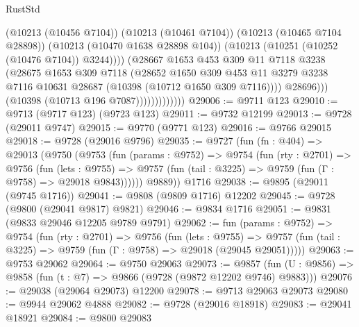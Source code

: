 \begin{lexlean}{RustStd}
\begin{coremodule}
                                  (@10213 (@10456 @7104))
                                  (@10213 (@10461 @7104))
                                  (@10213 (@10465 @7104 @28898))
                                  (@10213 (@10470 @1638 @28898 @104))
                                  (@10213 (@10251 (@10252 (@10476 @7104)) @3244))))
                              (@28667
                                @1653
                                @453
                                @309
                                @11
                                @7118
                                @3238
                                (@28675
                                  @1653
                                  @309
                                  @7118
                                  (@28652
                                    @1650
                                    @309
                                    @453
                                    @11
                                    @3279
                                    @3238
                                    @7116
                                    @10631
                                    @28687
                                    (@10398 (@10712 @1650 @309 @7116))))
                                @28696)))
                          (@10398 (@10713 @196 @7087)))))))))))))
@29006 := @9711 @123
@29010 := @9713 (@9717 @123) (@9723 @123)
@29011 := @9732 @12199
@29013 := @9728 (@29011 @9747)
@29015 := @9770 (@9771 @123)
@29016 := @9766 @29015
@29018 := @9728 (@29016 @9796)
@29035 := @9727
    (fun (fn : @404) =>
    @29013
      (@9750
        (@9753
          (fun (params : @9752) =>
          @9754
            (fun (rty : @2701) =>
            @9756
              (fun (lets : @9755) =>
              @9757 (fun (tail : @3225) => @9759 (fun (Γ : @9758) => @29018 @9843))))))
        @9889))
    @1716
@29038 := @9895 (@29011 (@9745 @1716))
@29041 := @9808 (@9809 @1716) @12202
@29045 := @9728 (@9800 (@29041 @9817) @9821)
@29046 := @9834 @1716
@29051 := @9831 (@9833 @29046 @12205 @9789 @9791)
@29062 := fun (params : @9752) =>
  @9754
    (fun (rty : @2701) =>
    @9756
      (fun (lets : @9755) =>
      @9757 (fun (tail : @3225) => @9759 (fun (Γ : @9758) => @29018 (@29045 @29051)))))
@29063 := @9753 @29062
@29064 := @9750 @29063
@29073 := @9857
    (fun (U : @9856) => @9858 (fun (t : @7) => @9866 (@9728 (@9872 @12202 @9746) @9883)))
@29076 := @29038 (@29064 @29073) @12200
@29078 := @9713 @29063 @29073
@29080 := @9944 @29062 @4888
@29082 := @9728 (@29016 @18918)
@29083 := @29041 @18921
@29084 := @9800 @29083

\end{coremodule}
\end{lexlean}
